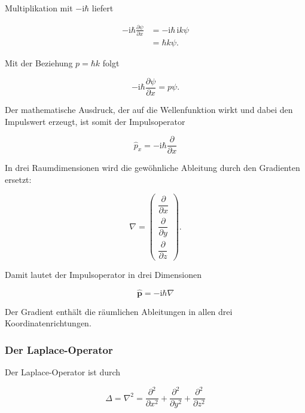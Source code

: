 Multiplikation mit \(-\mathrm{i}\hbar\) liefert

\begin{align}
	-\mathrm{i}\hbar
	\frac{\partial\psi}{\partial x}
	&=
	-\mathrm{i}\hbar\,\mathrm{i}k\psi
	\\
	&=
	\hbar k\psi.
\end{align}

Mit der Beziehung \(p=\hbar k\) folgt

\begin{equation}
	-\mathrm{i}\hbar
	\frac{\partial\psi}{\partial x}
	=
	p\psi.
	\label{eq:app_impulsoperator_eigenwert}
\end{equation}

Der mathematische Ausdruck, der auf die Wellenfunktion wirkt und dabei den
Impulswert erzeugt, ist somit der Impulsoperator

\begin{equation}
	\boxed{
		\hat{p}_x
		=
		-\mathrm{i}\hbar
		\frac{\partial}{\partial x}
	}
	\label{eq:app_impulsoperator_eindimensional}
\end{equation}

In drei Raumdimensionen wird die gewöhnliche Ableitung durch den
Gradienten ersetzt:

\begin{equation}
	\nabla
	=
	\begin{pmatrix}
		\dfrac{\partial}{\partial x}
		\\[6pt]
		\dfrac{\partial}{\partial y}
		\\[6pt]
		\dfrac{\partial}{\partial z}
	\end{pmatrix}.
	\label{eq:app_gradient_definition}
\end{equation}

Damit lautet der Impulsoperator in drei Dimensionen

\begin{equation}
	\boxed{
		\hat{\mathbf{p}}
		=
		-\mathrm{i}\hbar\nabla
	}
	\label{eq:app_impulsoperator_dreidimensional}
\end{equation}

Der Gradient enthält die räumlichen Ableitungen in allen drei
Koordinatenrichtungen.

\subsubsection*{Der Laplace-Operator}

Der Laplace-Operator ist durch

\begin{equation}
	\Delta
	=
	\nabla^2
	=
	\frac{\partial^2}{\partial x^2}
	+
	\frac{\partial^2}{\partial y^2}
	+
	\frac{\partial^2}{\partial z^2}
	\label{eq:app_laplace_operator}
\end{equation}

